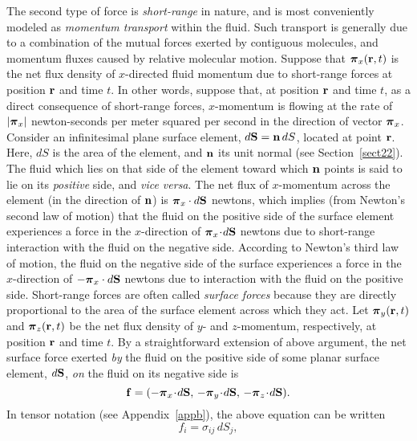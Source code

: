 The second type of force is {\em short-range}\/ in nature, and
is most conveniently modeled as {\em momentum transport}\/ within the fluid. Such transport is generally due to a combination of
the mutual forces exerted by contiguous molecules, and momentum fluxes caused by  relative molecular motion. 
Suppose that $\mbox{\boldmath$\pi$}_x({\bf r}, t)$ is the net flux density of $x$-directed fluid momentum due to
short-range forces
 at  position ${\bf r}$ and time $t$. In other words, suppose that, at position ${\bf r}$ and 
 time $t$,  as a direct consequence of short-range forces, $x$-momentum is flowing at the rate of
 $|\mbox{\boldmath$\pi$}_x|$ newton-seconds per meter squared per second in the direction of vector $\mbox{\boldmath$\pi$}_x$.  Consider an infinitesimal  plane surface element, $d{\bf S} = {\bf n}\,dS$,  located at point ${\bf r}$. Here, $dS$ is the
 area of the element, and  ${\bf n}$ its unit normal (see Section~\ref{sect22}). The fluid which lies
 on that side of the element toward which ${\bf n}$ points is said to lie on its {\em positive}\/ side, and {\em vice versa}. 
 The net flux of $x$-momentum across the element (in the direction of ${\bf n}$)  is
 $\mbox{\boldmath$\pi$}_x \cdot d{\bf S}$ newtons, which implies (from Newton's second law of motion) that the fluid  on the  positive side of the surface element
 experiences a force in the $x$-direction of $\mbox{\boldmath$\pi$}_x
 \!\cdot\! d{\bf S}$ newtons due to short-range
 interaction  with the fluid on the negative side. 
 According to Newton's third law of motion, the  fluid on the negative side of the surface  experiences a force in the $x$-direction of $-\mbox{\boldmath$\pi$}_x \cdot d{\bf S}$ newtons due to interaction with the  fluid on the positive side. 
 Short-range forces
 are often called {\em surface forces}\/ because they are directly  proportional to the area of the surface element across which
 they act. 
 Let $\mbox{\boldmath$\pi$}_y({\bf r},t)$ and $\mbox{\boldmath$\pi$}_z({\bf r},t)$ be the net flux density of $y$- and $z$-momentum, respectively, at position ${\bf r}$ and
 time $t$. By a straightforward extension of above argument, the net surface force exerted {\em by}\/ the fluid on the positive side of  some
 planar surface element, $d{\bf S}$, {\em on}\/ the fluid
 on its negative side is
 \begin{equation}\label{e4.2}
 {\bf f} = (-\mbox{\boldmath$\pi$}_x\!\cdot\! d{\bf S},\, -\mbox{\boldmath$\pi$}_y\!\cdot\!d{\bf S},\, -\mbox{\boldmath$\pi$}_z\!\cdot\!d{\bf S}).
 \end{equation}
 In tensor notation (see Appendix~\ref{appb}), the above equation can be written
 \begin{equation}\label{e4.3}
 f_i = \sigma_{ij}\,dS_j,
 \end{equation}
